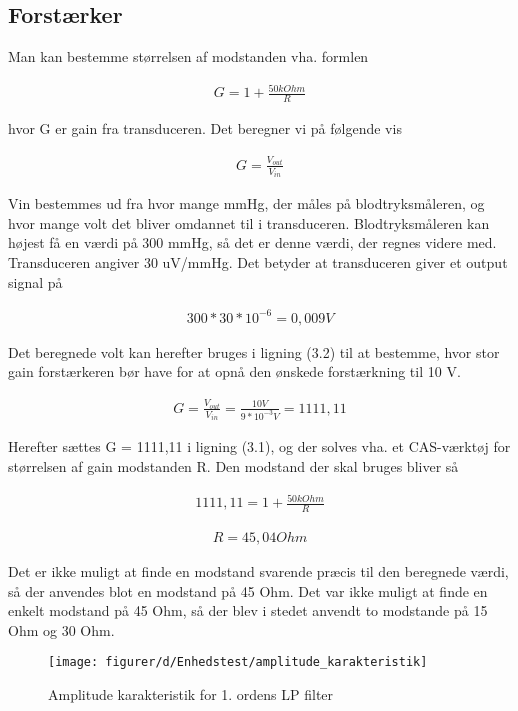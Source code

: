 \subsection{Forstærker}

Man kan bestemme størrelsen af modstanden vha. formlen

\begin{align}
G = 1+\frac{50 kOhm}{R}			
\end{align}

hvor G er gain fra transduceren. 
Det beregner vi på følgende vis

\begin{align}
G = \frac{V_{out}}{V_{in}} 			
\end{align}

Vin bestemmes ud fra hvor mange mmHg, der måles på blodtryksmåleren, og hvor mange volt det bliver omdannet til i transduceren. Blodtryksmåleren kan højest få en værdi på 300 mmHg, så det er denne værdi, der regnes videre med. 
Transduceren angiver 30 uV/mmHg. 
Det betyder at transduceren giver et output signal på

\begin{align}
300*30*10^{-6} = 0,009 V
\end{align}

Det beregnede volt kan herefter bruges i ligning (3.2) til at bestemme, hvor stor gain forstærkeren bør have for at opnå den ønskede forstærkning til 10 V.

\begin{align}
G = \frac{V_{out}}{V_{in}} = \frac{10 V}{9*10^{-3} V} = 1111,11
\end{align}

Herefter sættes G = 1111,11 i ligning (3.1), og der solves vha. et CAS-værktøj for størrelsen af gain modstanden R. 
Den modstand der skal bruges bliver så

\begin{align}
1111,11 = 1+\frac{50 kOhm}{R} 
\end{align}

\begin{align}
R = 45,04 Ohm
\end{align}

Det er ikke muligt at finde en modstand svarende præcis til den beregnede værdi, så der anvendes blot en modstand på 45 Ohm. Det var ikke muligt at finde en enkelt modstand på 45 Ohm, så der blev i stedet anvendt to modstande på 15 Ohm og 30 Ohm.

\begin{figure}[H]
    \centering
    \texttt{[image: figurer/d/Enhedstest/amplitude\_karakteristik]}
    \caption{Amplitude karakteristik for 1. ordens LP filter}
    \label{figtest_LP}
\end{figure}

